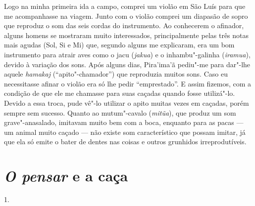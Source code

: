 Logo na minha primeira ida a campo, comprei um violão em São Luís para
que me acompanhasse na viagem. Junto com o violão comprei um diapasão de
sopro que reproduz o som das seis cordas do instrumento. Ao conhecerem o
afinador, alguns homens se mostraram muito interessados, principalmente
pelas três notas mais agudas (Sol, Si e Mi) que, segundo alguns me
explicaram, era um bom instrumento para atrair aves como o jacu
(\emph{jakua}) e o inhambu"-galinha (\emph{iramua}), devido à variação
dos sons. Após alguns dias, Pira'ima'ã pediu"-me para dar"-lhe aquele
\emph{hamakaj} (``apito"-chamador'') que reproduzia muitos sons. Caso eu
necessitasse afinar o violão era só lhe pedir ``emprestado''. E assim
fizemos, com a condição de que ele me chamasse para suas caçadas quando
fosse utilizá"-lo. Devido a essa troca, pude vê"-lo utilizar o apito
muitas vezes em caçadas, porém sempre sem sucesso. Quanto ao
mutum"-cavalo (\emph{mitũa}), que produz um som grave"-anasalado, imitavam
muito bem com a boca, enquanto para as pacas --- um animal muito caçado ---
não existe som característico que possam imitar, já que ela só emite o
bater de dentes nas coisas e outros grunhidos irreprodutíveis.

\section{\emph{O pensar} e a caça}

1.

